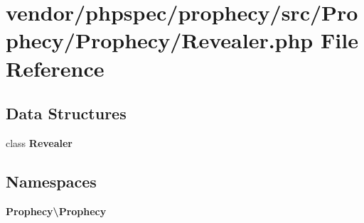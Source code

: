 \section{vendor/phpspec/prophecy/src/\+Prophecy/\+Prophecy/\+Revealer.php File Reference}
\label{_revealer_8php}
\subsection*{Data Structures}
\begin{DoxyCompactItemize}
\item 
class {\bf Revealer}
\end{DoxyCompactItemize}
\subsection*{Namespaces}
\begin{DoxyCompactItemize}
\item 
 {\bf Prophecy\textbackslash{}\+Prophecy}
\end{DoxyCompactItemize}
